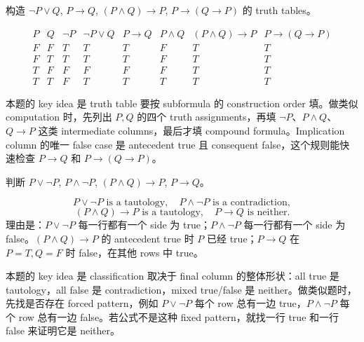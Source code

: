 \begin{exerciseblock}
构造 \(\lnot P\lor Q\), \(P\to Q\), \((P\land Q)\to P\), \(P\to(Q\to P)\) 的 truth tables。
\end{exerciseblock}

\begin{solution}
\[
\begin{array}{cc|cccccc}
P&Q&\lnot P&\lnot P\lor Q&P\to Q&P\land Q&(P\land Q)\to P&P\to(Q\to P)\\
\hline
F&F&T&T&T&F&T&T\\
F&T&T&T&T&F&T&T\\
T&F&F&F&F&F&T&T\\
T&T&F&T&T&T&T&T
\end{array}
\]
\end{solution}

\begin{explanation}
本题的 key idea 是 truth table 要按 subformula 的 construction order 填。做类似 computation 时，先列出 \(P,Q\) 的四个 truth assignments，再填 \(\lnot P\)、\(P\land Q\)、\(Q\to P\) 这类 intermediate columns，最后才填 compound formula。Implication column 的唯一 false case 是 antecedent true 且 consequent false，这个规则能快速检查 \(P\to Q\) 和 \(P\to(Q\to P)\)。
\end{explanation}

\begin{exerciseblock}
判断 \(P\lor\lnot P\), \(P\land\lnot P\), \((P\land Q)\to P\), \(P\to Q\)。
\end{exerciseblock}

\begin{solution}
\[
P\lor\lnot P\text{ is a tautology},\quad
P\land\lnot P\text{ is a contradiction},
\]
\[
(P\land Q)\to P\text{ is a tautology},\quad
P\to Q\text{ is neither}.
\]
理由是：\(P\lor\lnot P\) 每一行都有一个 side 为 true；\(P\land\lnot P\) 每一行都有一个 side 为 false。\((P\land Q)\to P\) 的 antecedent true 时 \(P\) 已经 true；\(P\to Q\) 在 \(P=T,Q=F\) 时 false，在其他 rows 中 true。
\end{solution}

\begin{explanation}
本题的 key idea 是 classification 取决于 final column 的整体形状：all true 是 tautology，all false 是 contradiction，mixed true/false 是 neither。做类似题时，先找是否存在 forced pattern，例如 \(P\lor\lnot P\) 每个 row 总有一边 true，\(P\land\lnot P\) 每个 row 总有一边 false。若公式不是这种 fixed pattern，就找一行 true 和一行 false 来证明它是 neither。
\end{explanation}

